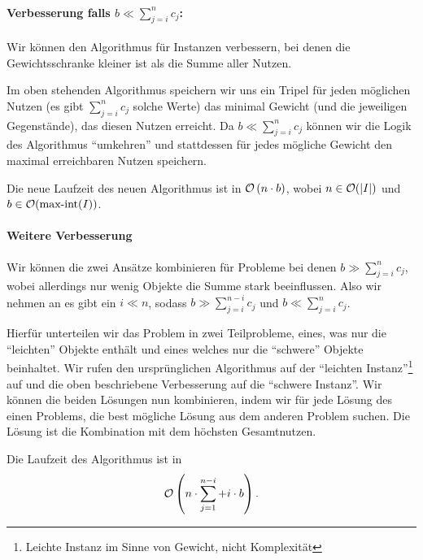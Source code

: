 \paragraph{Verbesserung falls \(b \ll \sum_{j=i}^{n} c_j\):}
Wir können den Algorithmus für Instanzen verbessern, 
bei denen die Gewichtsschranke kleiner ist als die Summe aller Nutzen.

Im oben stehenden Algorithmus speichern wir uns ein Tripel für jeden möglichen 
Nutzen (es gibt \(\sum_{j=i}^{n} c_j\) solche Werte) das minimal Gewicht (und 
die jeweiligen Gegenstände), das diesen Nutzen erreicht. Da \(b \ll \sum_{j=i}^{n} c_j\) 
können wir die Logik des Algorithmus ``umkehren'' und stattdessen für jedes 
mögliche Gewicht den maximal erreichbaren Nutzen speichern. 

Die neue Laufzeit des neuen Algorithmus ist in \(\mathcal{O} \left (n \cdot b\right)\), 
wobei \(n \in \mathcal{O}(|I|)\) und \(b \in \mathcal{O}(\text{max-int}(I))\).

\paragraph{Weitere Verbesserung} Wir können die zwei Ansätze kombinieren für 
Probleme bei denen \(b \gg \sum_{j=i}^{n} c_j\), wobei allerdings nur wenig 
Objekte die Summe stark beeinflussen. Also wir nehmen an es gibt ein \(i \ll n\), 
sodass \(b \gg \sum_{j=i}^{n - i} c_j\) und \(b \ll \sum_{j=i}^{n} c_j\).

Hierfür unterteilen wir das Problem in zwei Teilprobleme, eines, was nur die 
``leichten'' Objekte enthält und eines welches nur die ``schwere'' Objekte beinhaltet. 
Wir rufen den ursprünglichen Algorithmus auf der ``leichten Instanz''\footnote{Leichte 
Instanz im Sinne von Gewicht, nicht Komplexität} auf und die oben beschriebene 
Verbesserung auf die ``schwere Instanz''. Wir können die beiden Lösungen nun kombinieren, 
indem wir für jede Lösung des einen Problems, die best mögliche Lösung aus dem anderen 
Problem suchen. Die Lösung ist die Kombination mit dem höchsten Gesamtnutzen.

Die Laufzeit des Algorithmus ist in
\[\mathcal{O}\left(n \cdot \sum_{j = 1}^{n-i} + i \cdot b \right).\]

